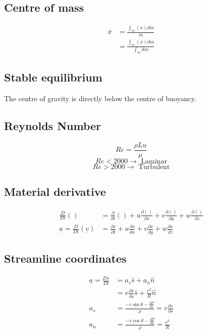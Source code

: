 \subsection{Centre of mass}
\begin{align*}
  \bar{x} & = \frac{\int_m (x) dm}{m}        \\
          & = \frac{\int_m (x)dm}{\int_m dm}
\end{align*}
\subsection{Stable equilibrium}
The centre of gravity is directly below the centre of buoyancy.
\subsection{Reynolds Number}
\begin{equation*}
  Re = \frac{\rho L u}{\mu}
\end{equation*}
\[ Re < 2000 \rightarrow \textrm{ Laminar} \]
\[ Re > 2000 \rightarrow \textrm{ Turbulent} \]
\subsection{Material derivative}
\begin{align*}
  \frac{D}{Dt}()                              & = \frac{\partial}{\partial t}() + u \frac{\partial()}{\partial x} + v \frac{\partial ()}{\partial y} + w\frac{\partial ()}{\partial z} \\
  \underline{a} = \frac{D}{Dt}(\underline{v}) & = \frac{\partial v}{\partial t} + u\frac{\partial v}{\partial x} + v\frac{\partial v}{\partial y} + w \frac{\partial v}{\partial z}
\end{align*}
\subsection{Streamline coordinates}
\begin{align*}
  \underline{a} = \frac{Dv}{Dt} & = a_s\hat{s} + a_n\hat{n}                                                                     \\
                                & = v\frac{\partial v}{\partial s} \hat{s} + \frac{v^2}{R} \hat{n}                              \\
  a_s                           & = \frac{-v\sin \theta - \frac{\partial P}{\partial s}}{\rho} = v\frac{\partial v}{\partial s} \\
  a_n                           & = \frac{-v\cos \theta -\frac{\partial P}{\partial n}}{\rho} = \frac{v^2}{R}
\end{align*}
